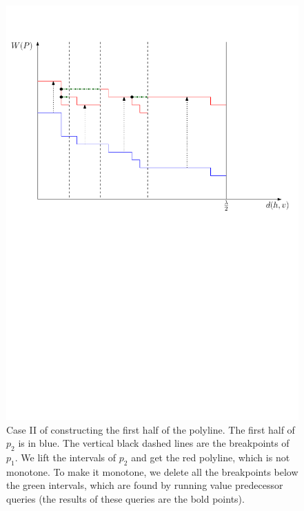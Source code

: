 \documentclass[11pt,a4paper]{article}
\theoremstyle{definition}
\theoremstyle{remark}
\begin{document}
\begin{figure}[h]
\begin{center}
\includegraphics[scale=0.6]{polyline_first_half_construction_case2}
\end{center}
\caption{Case II of constructing the first half of the polyline. The first half of $p_2$ is in blue. The vertical black dashed lines are the breakpoints of $p_1$. We lift the intervals of $p_2$ and get the red polyline, which is not monotone. To make it monotone, we delete all the breakpoints below the green intervals, which are found by running value predecessor queries (the results of these queries are the bold points).\label{figure of the second case in the construction of the first half of the polyline}
}
\end{figure}
\end{document}

